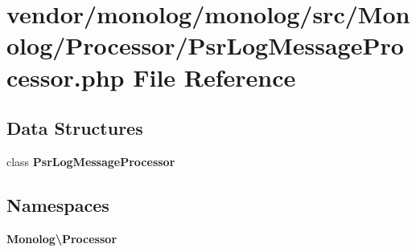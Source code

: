 \section{vendor/monolog/monolog/src/\+Monolog/\+Processor/\+Psr\+Log\+Message\+Processor.php File Reference}
\label{_psr_log_message_processor_8php}
\subsection*{Data Structures}
\begin{DoxyCompactItemize}
\item 
class {\bf Psr\+Log\+Message\+Processor}
\end{DoxyCompactItemize}
\subsection*{Namespaces}
\begin{DoxyCompactItemize}
\item 
 {\bf Monolog\textbackslash{}\+Processor}
\end{DoxyCompactItemize}
